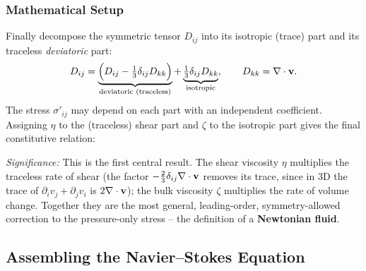 \documentclass[../main.tex]{subfiles}
\begin{document}
\subsubsection*{Mathematical Setup}
Finally decompose the symmetric tensor $D_{ij}$ into its isotropic (trace) part and its traceless \emph{deviatoric} part:
\begin{equation}
  D_{ij} = \underbrace{\Big(D_{ij} - \tfrac{1}{3}\delta_{ij}D_{kk}\Big)}_{\text{deviatoric (traceless)}}
         + \underbrace{\tfrac{1}{3}\delta_{ij}D_{kk}}_{\text{isotropic}},
  \qquad D_{kk}=\nabla \cdot\mathbf{v} .
  \label{eq:lec18_dev_iso}
\end{equation}
The stress $\sigma'_{ij}$ may depend on each part with an independent coefficient. Assigning $\eta$ to the (traceless) shear part and $\zeta$ to the isotropic part gives the final constitutive relation:

\textit{Significance:} This is the first central result. The shear viscosity $\eta$ multiplies the traceless rate of shear (the factor $-\tfrac{2}{3}\delta_{ij}\nabla \cdot\mathbf{v}$ removes its trace, since in 3D the trace of $\partial_iv_j+\partial_jv_i$ is $2\nabla \cdot\mathbf{v}$); the bulk viscosity $\zeta$ multiplies the rate of volume change. Together they are the most general, leading-order, symmetry-allowed correction to the pressure-only stress -- the definition of a \textbf{Newtonian fluid}.


\subsection{Assembling the Navier--Stokes Equation}\label{sec:lec18:ns}
\end{document}
